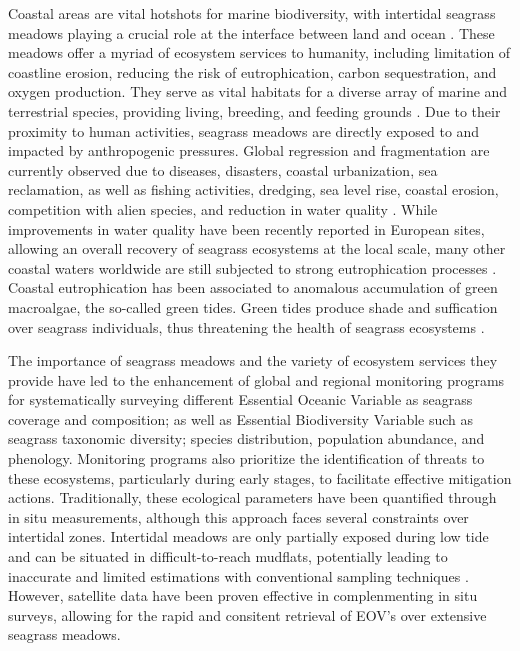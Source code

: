\documentclass[
  number]{elsarticle}
\begin{document}
Coastal areas are vital hotshots for marine biodiversity, with
intertidal seagrass meadows playing a crucial role at the interface
between land and ocean \citep{unsworth2022}. These meadows offer a
myriad of ecosystem services to humanity, including limitation of
coastline erosion, reducing the risk of eutrophication, carbon
sequestration, and oxygen production. They serve as vital habitats for a
diverse array of marine and terrestrial species, providing living,
breeding, and feeding grounds \citetext{\citealp[
]{gardner2018}; \citealp[ ]{Zoffoli2022}; \citealp{jankowska2019}}. Due
to their proximity to human activities, seagrass meadows are directly
exposed to and impacted by anthropogenic pressures. Global regression
and fragmentation are currently observed due to diseases, disasters,
coastal urbanization, sea reclamation, as well as fishing activities,
dredging, sea level rise, coastal erosion, competition with alien
species, and reduction in water quality \citetext{\citealp[
]{nguyen2021}; \citealp[ ]{soissons2018}; \citealp[
]{orth2006}; \citealp[ ]{lin2018}; \citealp{duffy2019}}. While
improvements in water quality have been recently reported in European
sites, allowing an overall recovery of seagrass ecosystems at the local
scale, many other coastal waters worldwide are still subjected to strong
eutrophication processes \citetext{\citealp[
]{deSantos2019}; \citealp{Zoffoli2021}}. Coastal eutrophication has been
associated to anomalous accumulation of green macroalgae, the so-called
green tides. Green tides produce shade and suffication over seagrass
individuals, thus threatening the health of seagrass ecosystems
\citetext{\citealp[ ]{Duarte2002}; \citealp{wang2022}}.

The importance of seagrass meadows and the variety of ecosystem services
they provide have led to the enhancement of global and regional
monitoring programs for systematically surveying different Essential
Oceanic Variable \citep{Miloslavich2018} as seagrass coverage and
composition; as well as Essential Biodiversity Variable
\citep{Pereira2013} such as seagrass taxonomic diversity; species
distribution, population abundance, and phenology. Monitoring programs
also prioritize the identification of threats to these ecosystems,
particularly during early stages, to facilitate effective mitigation
actions. Traditionally, these ecological parameters have been quantified
through in situ measurements, although this approach faces several
constraints over intertidal zones. Intertidal meadows are only partially
exposed during low tide and can be situated in difficult-to-reach
mudflats, potentially leading to inaccurate and limited estimations with
conventional sampling techniques \citep{nijland2019}. However, satellite
data have been proven effective in complenmenting in situ surveys,
allowing for the rapid and consitent retrieval of EOV's over extensive
seagrass meadows. \citetext{\citealp[ ]{Zoffoli2021}; \citealp[
]{xu2021}; \citealp[ ]{Traganos2018}; \citealp{coffer2023}}
\end{document}

